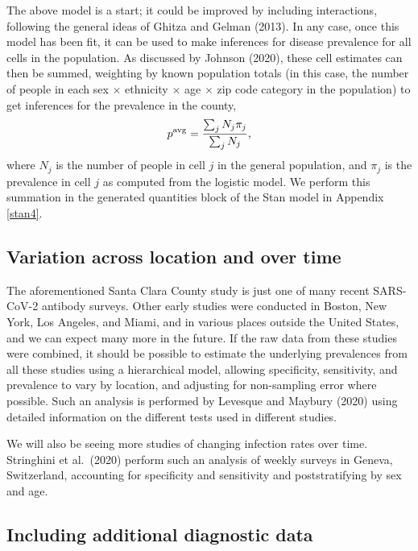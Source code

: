 \documentclass[11pt]{article}
\begin{document}
The above model is a start; it could be improved by including
interactions, following the general ideas of Ghitza and Gelman (2013).
In any case, once this model has been fit, it can be used to make
inferences for disease prevalence for all cells in the population. As
discussed by Johnson (2020), these cell estimates can then be summed,
weighting by known population totals (in this case, the number of
people in each sex $\times$ ethnicity $\times$ age $\times$ zip code
category in the population) to get inferences for the prevalence in
the county,
%
\begin{equation*}
  p^{\textrm{avg}}
  = \frac{\small\textstyle \sum_j N_j\pi_j}
         {\small\textstyle \sum_j N_j},
\end{equation*}
%
where $N_j$ is the
number of people in cell $j$ in the general population, and $\pi_j$ is
the prevalence in cell $j$ as computed from the logistic model.  We
perform this summation in the generated quantities block of the Stan
model in Appendix \ref{stan4}.

\subsection{Variation across location and over time}\label{muiltiple}

The aforementioned Santa Clara County study is just one of many recent
SARS-CoV-2 antibody surveys.  Other early studies were conducted in
Boston, New York, Los Angeles, and Miami, and in various places
outside the United States, and we can expect many more in the future.
If the raw data from these studies were combined, it should be
possible to estimate the underlying prevalences from all these studies
using a hierarchical model, allowing specificity, sensitivity, and
prevalence to vary by location, and adjusting for non-sampling error
where possible.  Such an analysis is performed by Levesque and Maybury
(2020) using detailed information on the different tests used in
different studies.

We will also be seeing more studies of changing infection rates over
time.  Stringhini et al.\ (2020) perform such an analysis of weekly
surveys in Geneva, Switzerland, accounting for specificity and
sensitivity and poststratifying by sex and age.

\subsection{Including additional diagnostic data}
\end{document}
